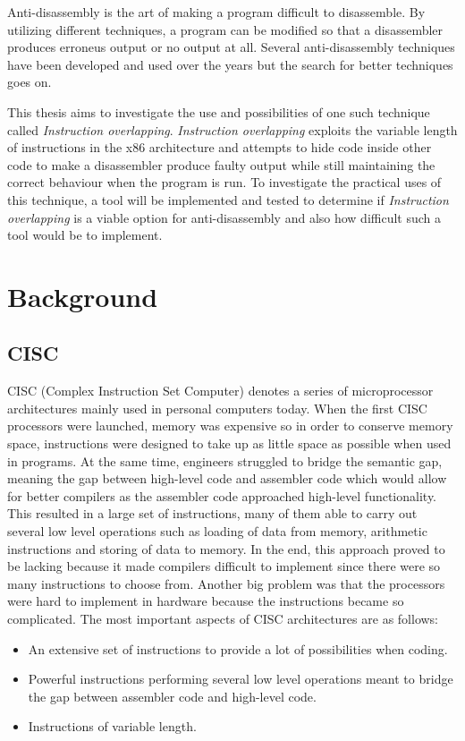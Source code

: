 \documentclass[11pt,twoside]{eitExjobb}
\begin{document}
Anti-disassembly is the art of making a program difficult to disassemble. By utilizing different techniques, a program can be modified so that a disassembler produces erroneus output or no output at all. Several anti-disassembly techniques have been developed and used over the years but the search for better techniques goes on. 

This thesis aims to investigate the use and possibilities of one such technique called \emph{Instruction overlapping}. \emph{Instruction overlapping} exploits the variable length of instructions in the x86 architecture and attempts to hide code inside other code to make a disassembler produce faulty output  while still maintaining the correct behaviour when the program is run. To investigate the practical uses of this technique, a tool will be implemented and tested to determine if \emph{Instruction overlapping} is a viable option for anti-disassembly and also how difficult such a tool would be to implement.


\chapter{Background}
\section{CISC}
CISC (Complex Instruction Set Computer) denotes a series of microprocessor architectures mainly used in personal computers today. When the first CISC processors were launched, memory was expensive so in order to conserve memory space, instructions were designed to take up as little space as possible when used in programs. At the same time, engineers struggled to bridge the semantic gap, meaning the gap between high-level code and assembler code which would allow for better compilers as the assembler code approached high-level functionality. This resulted in a large set of instructions, many of them able to carry out several low level operations such as loading of data from memory, arithmetic instructions and storing of data to memory. In the end, this approach proved to be lacking because it made compilers difficult to implement since there were so many instructions to choose from. Another big problem was that the processors were hard to implement in hardware because the instructions became so complicated. The most important aspects of CISC architectures are as follows:\cite{datorteknik}

\begin{itemize}
\item{An extensive set of instructions to provide a lot of possibilities when coding.}
\item{Powerful instructions performing several low level operations meant to bridge the gap between assembler code and high-level code.}
\item{Instructions of variable length.}
\end{itemize}
\end{document}
